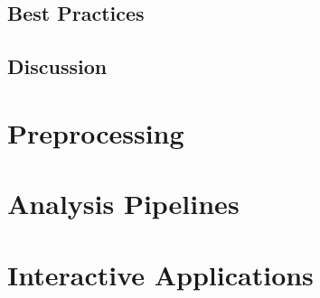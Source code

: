 \subsection{Best Practices} 

\subsection{Discussion} 

\section{Preprocessing} 

\section{Analysis Pipelines}

\section{Interactive Applications} 
